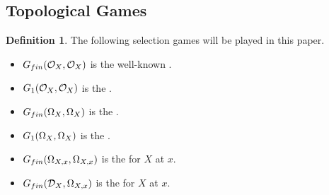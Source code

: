 \documentclass{amsart}
\theoremstyle{plain}
\theoremstyle{definition}
\newtheorem{definition}[theorem]{Definition}
\theoremstyle{remark}
\theoremstyle{plain}
\theoremstyle{definition}
\theoremstyle{remark}
\begin{document}
\subsection{Topological Games}

\begin{definition}
 The following selection games will be played in this paper.
 \begin{itemize}
   \item \(G_{fin}(\mathcal{O}_X,\mathcal{O}_X)\) is the well-known .
   \item \(G_{1}(\mathcal{O}_X,\mathcal{O}_X)\) is the .
   \item \(G_{fin}(\Omega_X,\Omega_X)\) is the .
   \item \(G_{1}(\Omega_X,\Omega_X)\) is the .
   \item \(G_{fin}(\Omega_{X,x},\Omega_{X,x})\) is the  for \(X\) at \(x\).
   \item \(G_{fin}(\mathcal{D}_X,\Omega_{X,x})\) is the  for \(X\) at \(x\).
 \end{itemize}
\end{definition}
  
\end{document}
